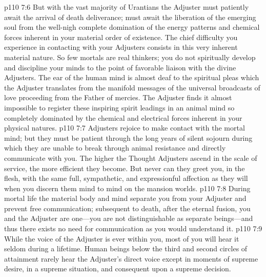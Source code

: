 \pc \vs p110 7:6 But with the vast majority of Urantians the Adjuster must patiently await the arrival of death deliverance; must await the liberation of the emerging soul from the well\hyp{}nigh complete domination of the energy patterns and chemical forces inherent in your material order of existence. The chief difficulty you experience in contacting with your Adjusters consists in this very inherent material nature. So few mortals are real thinkers; you do not spiritually develop and discipline your minds to the point of favorable liaison with the divine Adjusters. The ear of the human mind is almost deaf to the spiritual pleas which the Adjuster translates from the manifold messages of the universal broadcasts of love proceeding from the Father of mercies. The Adjuster finds it almost impossible to register these inspiring spirit leadings in an animal mind so completely dominated by the chemical and electrical forces inherent in your physical natures.
\vs p110 7:7 Adjusters rejoice to make contact with the mortal mind; but they must be patient through the long years of silent sojourn during which they are unable to break through animal resistance and directly communicate with you. The higher the Thought Adjusters ascend in the scale of service, the more efficient they become. But never can they greet you, in the flesh, with the same full, sympathetic, and expressionful affection as they will when you discern them mind to mind on the mansion worlds.
\vs p110 7:8 During mortal life the material body and mind separate you from your Adjuster and prevent free communication; subsequent to death, after the eternal fusion, you and the Adjuster are one---you are not distinguishable as separate beings---and thus there exists no need for communication as you would understand it.
\vs p110 7:9 While the voice of the Adjuster is ever within you, most of you will hear it seldom during a lifetime. Human beings below the third and second circles of attainment rarely hear the Adjuster’s direct voice except in moments of supreme desire, in a supreme situation, and consequent upon a supreme decision.
